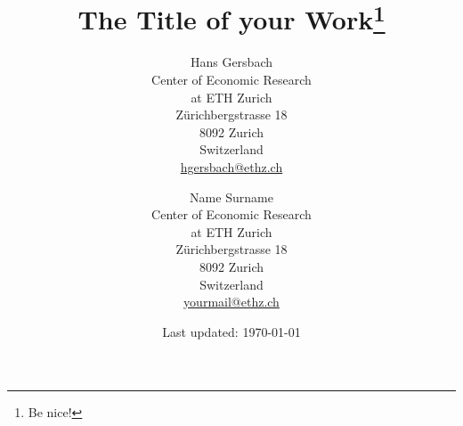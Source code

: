 \documentclass[
	12pt, %
	a4paper, %
	]{article}
\theoremstyle{break} %
\begin{document}
\begin{titlepage}
\singlespacing
\title{
	The Title of your Work\thanks{Be nice!}
}

\author{
	Hans Gersbach\\
	\normalsize Center of Economic Research\\
	\normalsize at ETH Zurich\\ 
	\normalsize Z\"{u}richbergstrasse 18\\
	\normalsize 8092 Zurich\\
	\normalsize Switzerland\\ 
	\normalsize \href{mailto:hgersbach@ethz.ch}{hgersbach@ethz.ch}
	\and
	Name Surname\\
	\normalsize Center of Economic Research\\
	\normalsize at ETH Zurich\\ 
	\normalsize Z\"{u}richbergstrasse 18\\
	\normalsize 8092 Zurich\\
	\normalsize Switzerland\\ 
	\normalsize \href{mailto:yourmail@ethz.ch}{yourmail@ethz.ch}
	}

\date{Last updated: \today}

\maketitle


\end{titlepage}
\end{document}
